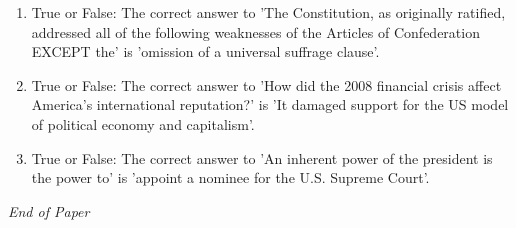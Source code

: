\documentclass[12pt]{article}
\begin{document}
\begin{enumerate}[label=\arabic*.]
\item True or False: The correct answer to 'The Constitution, as originally ratified, addressed all of the following weaknesses of the Articles of Confederation EXCEPT the' is 'omission of a universal suffrage clause'.
\item True or False: The correct answer to 'How did the 2008 financial crisis affect America's international reputation?' is 'It damaged support for the US model of political economy and capitalism'.
\item True or False: The correct answer to 'An inherent power of the president is the power to' is 'appoint a nominee for the U.S. Supreme Court'.
\end{enumerate}

\vfill
\noindent\textit{End of Paper}
\end{document}

